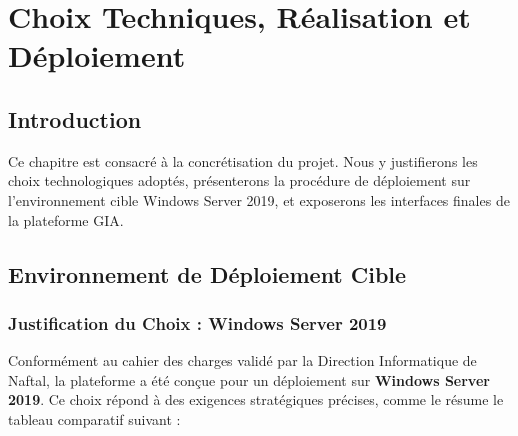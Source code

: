\chapter{Choix Techniques, Réalisation et Déploiement}

\section{Introduction}
Ce chapitre est consacré à la concrétisation du projet. Nous y justifierons les choix
technologiques adoptés, présenterons la procédure de déploiement sur l'environnement
cible Windows Server 2019, et exposerons les interfaces finales de la plateforme GIA.

\section{Environnement de Déploiement Cible}

\subsection{Justification du Choix : Windows Server 2019}
Conformément au cahier des charges validé par la Direction Informatique de Naftal,
la plateforme a été conçue pour un déploiement sur \textbf{Windows Server 2019}. Ce
choix répond à des exigences stratégiques précises, comme le résume le tableau
comparatif suivant :


